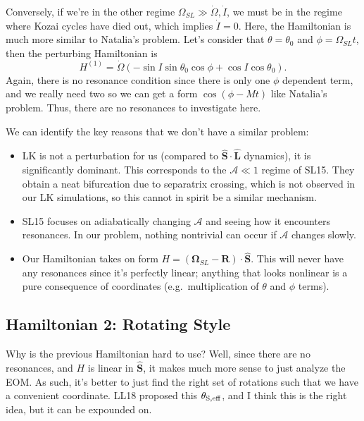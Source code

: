 \documentclass[11pt,
        usenames, %
        dvipsnames %
    ]{article}
\newcommand*{\bm}[1]{\boldsymbol{\mathbf{#1}}}
\newcommand*{\uv}[1]{\hat{\bm{#1}}}
\newcommand*{\p}[1]{\left(#1\right)}
\begin{document}
Conversely, if we're in the other regime $\Omega_{SL} \gg \dot{\Omega},
\dot{I}$, we must be in the regime where Kozai cycles have died out, which
implies $\dot{I} = 0$. Here, the Hamiltonian is much more similar to Natalia's
problem. Let's consider that $\theta = \theta_0$ and $\phi = \Omega_{SL}t$, then
the perturbing Hamiltonian is
\begin{equation}
    H^{(1)} = \dot{\Omega}\p{-\sin I \sin \theta_0 \cos \phi
        + \cos I \cos \theta_0}.
\end{equation}
Again, there is no resonance condition since there is only one $\phi$ dependent
term, and we really need two so we can get a form $\cos \p{\phi - Mt}$ like
Natalia's problem. Thus, there are no resonances to investigate here.

We can identify the key reasons that we don't have a similar problem:
\begin{itemize}
    \item LK is not a perturbation for us (compared to $\uv{S} \cdot \uv{L}$
        dynamics), it is significantly dominant. This corresponds to the
        $\mathcal{A} \ll 1$ regime of SL15. They obtain a neat bifurcation due
        to separatrix crossing, which is not observed in our LK simulations, so
        this cannot in spirit be a similar mechanism.

    \item SL15 focuses on adiabatically changing $\mathcal{A}$ and seeing how it
        encounters resonances. In our problem, nothing nontrivial can occur if
        $\mathcal{A}$ changes slowly.

    \item Our Hamiltonian takes on form $H = \p{\bm{\Omega}_{SL} - \bm{R}}
        \cdot \uv{S}$. This will never have any resonances since it's perfectly
        linear; anything that looks nonlinear is a pure consequence of
        coordinates (e.g.\ multiplication of $\theta$ and $\phi$ terms).
\end{itemize}

\subsection{Hamiltonian 2: Rotating Style}

Why is the previous Hamiltonian hard to use? Well, since there are no
resonances, and $H$ is linear in $\uv{S}$, it makes much more sense to just
analyze the EOM\@. As such, it's better to just find the right set of rotations
such that we have a convenient coordinate. LL18 proposed this $\theta_{\rm S,
eff}$, and I think this is the right idea, but it can be expounded on.
\end{document}
